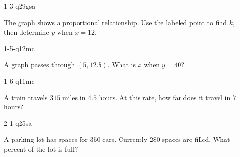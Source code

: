 
\begin{practiceQuestion}{1-3-q29}{gsa}
\begin{questionText}
The graph shows a proportional relationship. Use the labeled point to find $k$, then determine $y$ when $x = 12$.

\begin{center}
\end{center}
\end{questionText}
\end{practiceQuestion}

\begin{practiceQuestion}{1-5-q12}{mc}
\begin{questionText}
A graph passes through $(5, 12.5)$. What is $x$ when $y = 40$?
\end{questionText}
\end{practiceQuestion}

\begin{practiceQuestion}{1-6-q11}{mc}
\begin{questionText}
A train travels $315$ miles in $4.5$ hours. At this rate, how far does it travel in $7$ hours?
\end{questionText}
\end{practiceQuestion}

\begin{practiceQuestion}{2-1-q25}{sa}
\begin{questionText}
A parking lot has spaces for $350$ cars. Currently $280$ spaces are filled. What percent of the lot is full?
\end{questionText}
\end{practiceQuestion}

